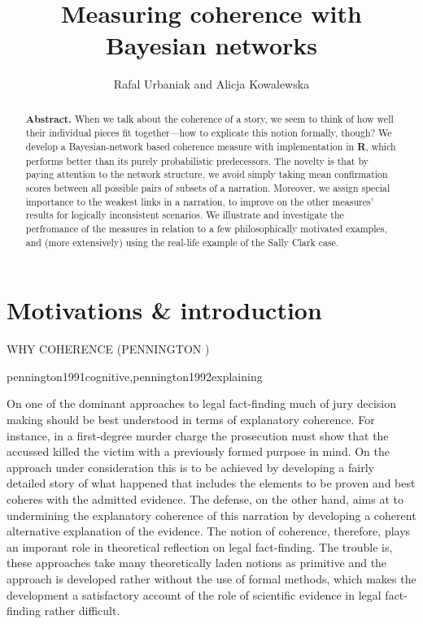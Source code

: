 \documentclass[10pt,]{scrartcl}
\title{Measuring coherence with Bayesian networks}
\author{Rafal Urbaniak and Alicja Kowalewska}
\date{\vspace{-2.5em}}
\begin{document}
\maketitle
\vspace{3mm}

\begin{abstract}  \textbf{Abstract.} When we talk about the  coherence of a story, we seem to think of how well their individual pieces fit together---how  to explicate this notion formally, though?  We  develop a Bayesian-network based coherence measure with implementation in \textbf{\textsf{R}}, which  performs better than its purely probabilistic predecessors. The novelty is that  by paying attention to  the network structure,  we avoid simply taking mean confirmation scores between all possible pairs of subsets of a narration. Moreover, we assign special importance to the weakest links in a narration, to improve on the other measures' results for logically inconsistent scenarios.  
 We illustrate  and investigate the  perfromance of the measures in relation to a few philosophically motivated examples, and (more extensively) using the real-life example of the  Sally Clark case. 
\end{abstract}






\section{Motivations \& introduction}


WHY COHERENCE (PENNINGTON )


pennington1991cognitive,pennington1992explaining


On one of the dominant approaches to legal fact-finding \citep{pennington1991cognitive,pennington1992explaining,pennington1993story,allen2010no} much of jury decision making should be best understood in terms of explanatory coherence. For instance, in a first-degree murder charge the prosecution must show that the accussed killed the victim with a previously formed purpose in mind. On the approach under consideration this is to be achieved by developing a fairly detailed story of what happened that includes the elements to be proven and best coheres with the admitted evidence. The defense, on the other hand, aims at  to undermining the explanatory coherence of this narration by  developing a coherent alternative explanation of the evidence. The notion of coherence, therefore, plays an imporant role in theoretical reflection on legal fact-finding. The trouble is, these approaches take many theoretically laden notions as primitive and the approach is developed rather without the use of formal methods, which makes the development a satisfactory account of the role of scientific evidence in legal fact-finding rather difficult.
\end{document}
